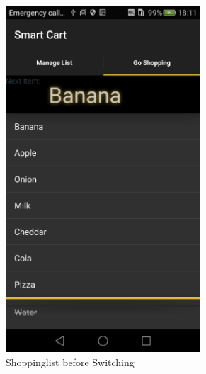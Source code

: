 \begin{figure}[h]
\captionsetup{justification=centering}
\begin{subfigure}{0.475\textwidth} 
\includegraphics[width=0.8\textwidth, height=
0.35\textheight]{res/usermanual/firstItemChecked.png}
\caption{Shoppinglist before Switching}
\label{fig:beforeSwitching}
\end{subfigure} \hspace{0.2\textwidth}
\begin{subfigure}{0.475\textwidth}

\end{subfigure}
\end{figure}
